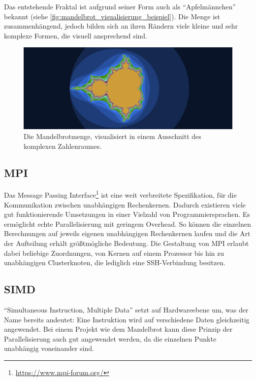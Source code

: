 Das entstehende Fraktal ist aufgrund seiner Form auch als “Apfelmännchen” bekannt (siehe \autoref{fig:mandelbrot_visualisierung_beispiel}).
Die Menge ist zusammenhängend, jedoch bilden sich an ihren Rändern viele kleine und sehr komplexe Formen, die visuell ansprechend sind.

\begin{figure}
	\centering
	\includegraphics[width=0.9\linewidth]{img/Einleitung/Mandelbrot_visualization_example.png}
	\caption{Die Mandelbrotmenge, visualisiert in einem Ausschnitt des komplexen Zahlenraumes.}
	\label{fig:mandelbrot_visualisierung_beispiel}
\end{figure}

\subsection{MPI}

Das Message Passing Interface\footnote{\url{https://www.mpi-forum.org/}} ist eine weit verbreitete Spezifikation, für die Kommunikation zwischen unabhängigen Rechenkernen.
Dadurch existieren viele gut funktionierende Umsetzungen in einer Vielzahl von Programmiersprachen.
Es ermöglicht echte Parallelisierung mit geringem Overhead.
So können die einzelnen Berechnungen auf jeweils eigenen unabhängigen Rechenkernen laufen und
die Art der Aufteilung erhält größtmögliche Bedeutung.
Die Gestaltung von MPI erlaubt dabei beliebige Zuordnungen, von Kernen auf einem Prozessor bis hin zu unabhängigen Clusterknoten, die lediglich eine SSH-Verbindung besitzen.



\subsection{SIMD} \label{par:introduction_simd}

\enquote{Simultaneous Instruction, Multiple Data} setzt auf Hardwareebene um, was der Name bereits andeutet:
Eine Instruktion wird auf verschiedene Daten gleichzeitig angewendet.
Bei einem Projekt wie dem Mandelbrot kann diese Prinzip der Parallelisierung auch gut angewendet werden,
da die einzelnen Punkte unabhängig voneinander sind.


